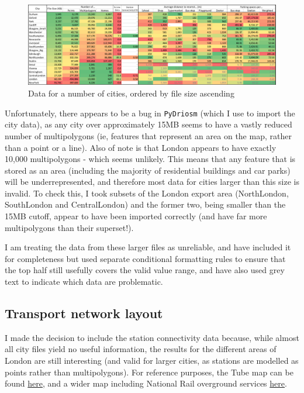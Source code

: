 \documentclass[12pt]{article} %
\begin{document}
\begin{figure}
	\includegraphics[width=\textwidth]{data.png}
	\caption{Data for a number of cities, ordered by file size ascending}
	\label{Fig:1}
\end{figure}

Unfortunately, there appears to be a bug in \texttt{PyDriosm} (which I use to import the city data), as any city over approximately 15MB seems to have a vastly reduced number of multipolygons (ie, features that represent an area on the map, rather than a point or a line). Also of note is that London appears to have exactly 10,000 multipolygons - which seems unlikely. This means that any feature that is stored as an area (including the majority of residential buildings and car parks) will be underrepresented, and therefore most data for cities larger than this size is invalid. To check this, I took subsets of the London export area (NorthLondon, SouthLondon and CentralLondon) and the former two, being smaller than the 15MB cutoff, appear to have been imported correctly (and have far more multipolygons than their superset!).

I am treating the data from these larger files as unreliable, and have included it for completeness but used separate conditional formatting rules to ensure that the top half still usefully covers the valid value range, and have also used grey text to indicate which data are problematic.

\subsection{Transport network layout}
I made the decision to include the station connectivity data because, while almost all city files yield no useful information, the results for the different areas of London are still interesting (and valid for larger cities, as stations are modelled as points rather than multipolygons). For reference purposes, the Tube map can be found \href{https://content.tfl.gov.uk/standard-tube-map.pdf}{here}, and a wider map including National Rail overground services \href{https://content.tfl.gov.uk/london-rail-and-tube-services-map.pdf}{here}.
\end{document}
